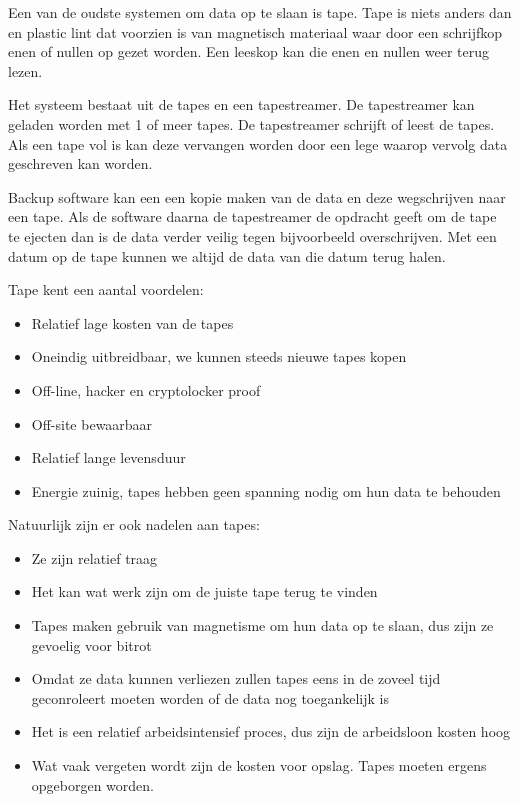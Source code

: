 Een van de oudste systemen om data op te slaan is tape. Tape is niets anders dan en plastic lint dat voorzien is van magnetisch materiaal waar door een schrijfkop enen of nullen op gezet worden. Een leeskop kan die enen en nullen weer terug lezen.

Het systeem bestaat uit de tapes en een tapestreamer. De tapestreamer kan geladen worden met 1 of meer tapes. De tapestreamer schrijft of leest de tapes. Als een tape vol is kan deze vervangen worden door een lege waarop vervolg data geschreven kan worden.

Backup software kan een een kopie maken van de data en deze wegschrijven naar een tape. Als de software daarna de tapestreamer de opdracht geeft om de tape te ejecten dan is de data verder veilig tegen bijvoorbeeld overschrijven. Met een datum op de tape kunnen we altijd de data van die datum terug halen.

Tape kent een aantal voordelen:
\begin{itemize}
\item Relatief lage kosten van de tapes
\item Oneindig uitbreidbaar, we kunnen steeds nieuwe tapes kopen
\item Off-line, hacker en cryptolocker proof
\item Off-site bewaarbaar
\item Relatief lange levensduur
\item Energie zuinig, tapes hebben geen spanning nodig om hun data te behouden
\end{itemize}

Natuurlijk zijn er ook nadelen aan tapes:
\begin{itemize}
\item Ze zijn relatief traag
\item Het kan wat werk zijn om de juiste tape terug te vinden
\item Tapes maken gebruik van magnetisme om hun data op te slaan, dus zijn ze gevoelig voor bitrot
\item Omdat ze data kunnen verliezen zullen tapes eens in de zoveel tijd geconroleert moeten worden of de data nog toegankelijk is
\item Het is een relatief arbeidsintensief proces, dus zijn de arbeidsloon kosten hoog
\item Wat vaak vergeten wordt zijn de kosten voor opslag. Tapes moeten ergens opgeborgen worden.
\end{itemize}

